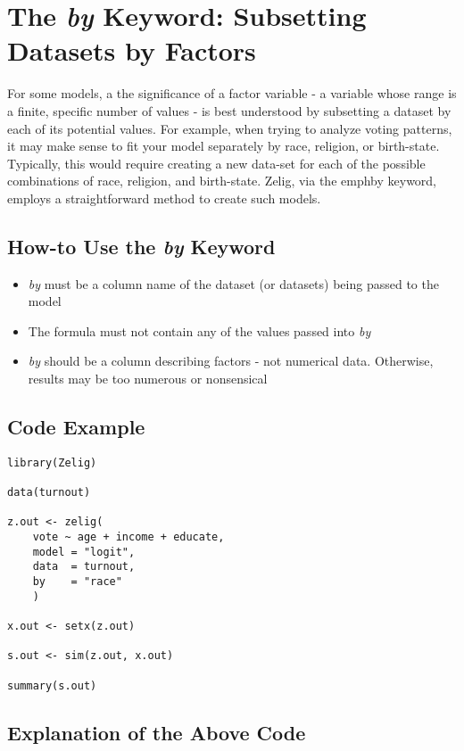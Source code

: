 \documentclass[a4paper,11pt]{article}
\begin{document}
\section{The \emph{by} Keyword: Subsetting Datasets by Factors}

For some models, a the significance of a factor variable - a variable whose range is a finite, specific number of values - is best understood by subsetting a dataset by each of its potential values.  For example, when trying to analyze voting patterns, it may make sense to fit your model separately by race, religion, or birth-state.  Typically, this would require creating a new data-set for each of the possible combinations of race, religion, and birth-state.  Zelig, via the emph{by} keyword, employs a straightforward method to create such models.

\subsection{How-to Use the \emph{by} Keyword}

\begin{itemize}
	\item{\emph{by} must be a column name of the dataset (or datasets) being passed to the model}
	\item{The formula must not contain any of the values passed into \emph{by}}
	\item{\emph{by} should be a column describing factors - not numerical data.  Otherwise, results may be too numerous or nonsensical}
\end{itemize}

\subsection{Code Example}

\begin{lstlisting}
library(Zelig)

data(turnout)

z.out <- zelig(
	vote ~ age + income + educate,
	model = "logit",
	data  = turnout,
	by    = "race"
	)

x.out <- setx(z.out)

s.out <- sim(z.out, x.out)

summary(s.out)
\end{lstlisting}

\vspace{4mm}

\subsection{Explanation of the Above Code}
\end{document}
